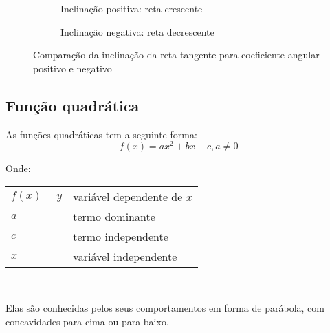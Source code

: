 \documentclass[12pt,openright,twoside,a4paper]{article}
\makeatletter
\theoremstyle{definition}
\newenvironment{condicoes}[1][Onde:]
{#1 \begin{tabular}[t]{>{$}l<{$} @{${} \implies {}$} l}}
	{\end{tabular}\\[\belowdisplayskip]}
\makeatother
\begin{document}
	\begin{figure}[h]
		\centering
		\begin{subfigure}[t]{0.45\textwidth}
			\centering
			\caption{Inclinação positiva: reta crescente}
		\end{subfigure}
		\hspace{1cm}
		\begin{subfigure}[t]{0.45\textwidth}
			\centering
			\caption{Inclinação negativa: reta decrescente}
		\end{subfigure}
		\caption{Comparação da inclinação da reta tangente para coeficiente angular positivo e negativo}
	\end{figure}
	
	\pagebreak
	\subsection{Função quadrática}
	As funções quadráticas tem a seguinte forma:
	\begin{equation}
		f(x) = ax^2 + bx + c, a \neq 0
	\end{equation}
	
	\begin{condicoes}
		f(x)=y & variável dependente de $x$\\
		a & termo dominante\\
		c & termo independente\\
		x & variável independente
	\end{condicoes}
	
	Elas são conhecidas pelos seus comportamentos em forma de parábola, com concavidades para cima ou para baixo.
	
\end{document}
